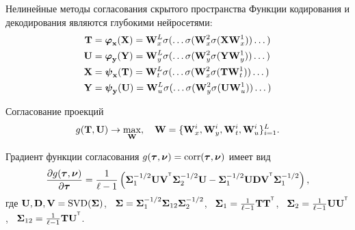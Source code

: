 \documentclass[10pt]{beamer}
\begin{document}
\begin{frame}{Нелинейные методы согласования скрытого пространства}
	Функции кодирования и декодирования являются глубокими нейросетями:
	\vspace{-0.1cm}
	\begin{align*}
		\bT &= \bphi_\bx(\bX) =  \bW_x^L \sigma(\dots \sigma(\bW_x^2 \sigma(\bX \bW_x^1)) \dots ) \\
		\bU &= \bphi_\by(\bY) =  \bW_y^L \sigma(\dots \sigma(\bW_y^2 \sigma(\bY \bW_y^1)) \dots ) \\
		\bX &= \bpsi_\bx(\bT) =  \bW_t^L \sigma(\dots \sigma(\bW_x^2 \sigma(\bT \bW_t^1)) \dots ) \\
		\bY &= \bpsi_\by(\bU) =  \bW_u^L \sigma(\dots \sigma(\bW_y^2 \sigma(\bU \bW_u^1)) \dots )
	\end{align*}
	\vspace{-0.4cm}
	\begin{block}{Согласование проекций}
		\vspace{-0.3cm}
		\[
			g(\bT, \bU) \rightarrow \max_{\bW}, \quad \bW = \{\bW_x^i, \bW_y^i, \bW_t^i, \bW_u^i\}_{i=1}^L.
		\]
	\end{block}	
	\vspace{-0.3cm}
		Градиент функции согласования $g(\btau, \bnu) = \textnormal{corr}(\btau, \bnu)$ имеет вид
		\[
			\frac{\partial g(\btau, \bnu)}{\partial \btau} = \frac{1}{\ell - 1} \left(\bSigma_1^{-1/2} \bU \bV^{\T} \bSigma_2^{-1/2} \bU - \bSigma_1^{-1/2} \bU \bD \bV^{\T} \bSigma_1^{-1/2} \right),
		\]
		где $\bU, \bD, \bV = \textnormal{SVD}(\bSigma)$, \, $\bSigma = \bSigma_1^{-1/2} \bSigma_{12} \bSigma_2^{-1/2} $, \, $\bSigma_1 = \frac{1}{\ell - 1} \bT \bT^{\T}$, \, $\bSigma_2 = \frac{1}{\ell - 1} \bU \bU^{\T}$, \, $\bSigma_{12} = \frac{1}{\ell - 1} \bT \bU^{\T}$.
\end{frame}
\end{document}
